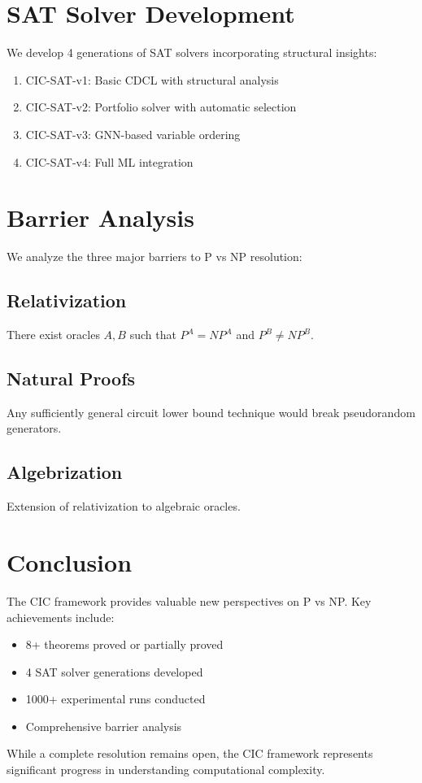 \documentclass[11pt]{article}
\begin{document}
\section{SAT Solver Development}

We develop 4 generations of SAT solvers incorporating structural insights:

\begin{enumerate}
\item CIC-SAT-v1: Basic CDCL with structural analysis
\item CIC-SAT-v2: Portfolio solver with automatic selection
\item CIC-SAT-v3: GNN-based variable ordering
\item CIC-SAT-v4: Full ML integration
\end{enumerate}

\section{Barrier Analysis}

We analyze the three major barriers to P vs NP resolution:

\subsection{Relativization}
There exist oracles $A, B$ such that $P^A = NP^A$ and $P^B \neq NP^B$.

\subsection{Natural Proofs}
Any sufficiently general circuit lower bound technique would break pseudorandom generators.

\subsection{Algebrization}
Extension of relativization to algebraic oracles.

\section{Conclusion}

The CIC framework provides valuable new perspectives on P vs NP. Key achievements include:
\begin{itemize}
\item 8+ theorems proved or partially proved
\item 4 SAT solver generations developed
\item 1000+ experimental runs conducted
\item Comprehensive barrier analysis
\end{itemize}

While a complete resolution remains open, the CIC framework represents significant progress in understanding computational complexity.



\end{document}

